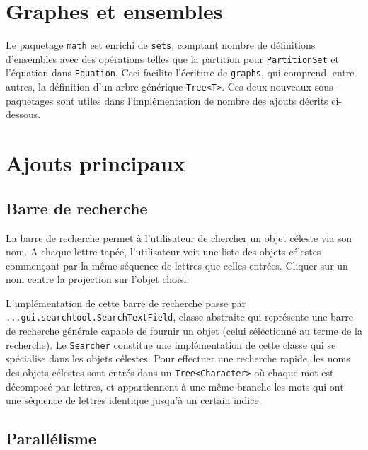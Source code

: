 \documentclass[10pt,a4paper]{report}
\author{Alexandre Sallinen, Salim Najib}
\begin{document}
\newcommand{\code}[1]{\texttt{#1}}

\section*{}

\section*{Graphes et ensembles}

Le paquetage \code{math} est enrichi de \code{sets}, comptant nombre de définitions d'ensembles avec des opérations telles que la partition pour \code{PartitionSet} et l'équation dans \code{Equation}. Ceci facilite l'écriture de \code{graphs}, qui comprend, entre autres, la définition d'un arbre générique \code{Tree<T>}. Ces deux nouveaux sous-paquetages sont utiles dans l'implémentation de nombre des ajouts décrits ci-dessous.

\section*{Ajouts principaux}

\subsection*{Barre de recherche}

La barre de recherche permet à l'utilisateur de chercher un objet céleste via son nom. A chaque lettre tapée, l'utilisateur voit une liste des objets célestes commençant par la même séquence de lettres que celles entrées. Cliquer sur un nom centre la projection sur l'objet choisi.

L'implémentation de cette barre de recherche passe par \linebreak\code{...gui.searchtool.SearchTextField}, classe abstraite qui représente une barre de recherche générale capable de fournir un objet (celui séléctionné au terme de la recherche). Le \code{Searcher} constitue une implémentation de cette classe qui se spécialise dans les objets célestes. Pour effectuer une recherche rapide, les noms des objets célestes sont entrés dans un \code{Tree<Character>} où chaque mot est décomposé par lettres, et appartiennent à une même branche les mots qui ont une séquence de lettres identique jusqu'à un certain indice.

\subsection*{Parallélisme}
\end{document}
